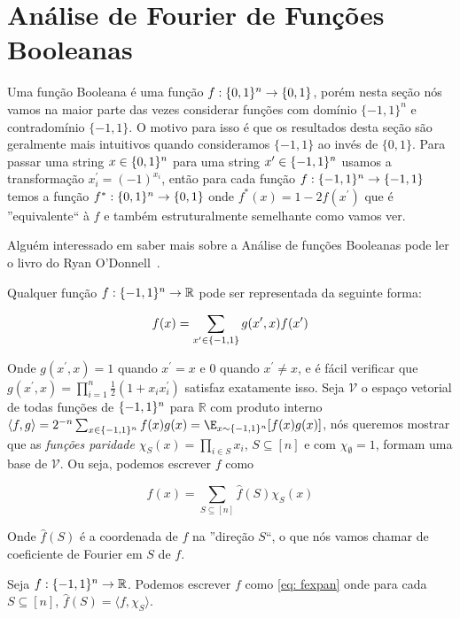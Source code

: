 \chapter{Análise de Fourier de Funções Booleanas} \label{funcoes_booleanas}

Uma função Booleana é uma função $f: \{0, 1\}^{n} \to \{0, 1\}$, porém nesta seção nós vamos na maior parte das vezes considerar funções com domínio $\{-1, 1\}^{n}$ e contradomínio $\{-1, 1\}$. O motivo para isso é que os resultados desta seção são geralmente mais intuitivos quando consideramos $\{-1, 1\}$ ao invés de $\{0, 1\}$. Para passar uma string $x \in \{0, 1\}^{n}$ para uma string $x^{\prime} \in \{-1, 1\}^{n}$ usamos a transformação $x^{\prime}_{i} = (-1)^{x_{i}}$, então para cada função $f: \{-1, 1\}^{n} \to \{-1, 1\}$ temos a função $f^{*}: \{0, 1\}^{n} \to \{0, 1\}$ onde $f^{*}(x) = 1 - 2f(x^{\prime})$ que é ''equivalente`` à $f$ e também estruturalmente semelhante como vamos ver.

Alguém interessado em saber mais sobre a Análise de funções Booleanas pode ler o livro do Ryan O'Donnell~\cite{o2014analysis}.

Qualquer função $f: \{-1, 1\}^{n} \to \mathbb{R}$ pode ser representada da seguinte forma:

\begin{equation} \label{eq: interpol}
f(x) = \sum_{x^{\prime} \in \{-1, 1\}} g(x^{\prime}, x)f(x^{\prime})
\end{equation}

Onde $g(x^{\prime}, x) = 1$ quando $x^{\prime} = x$ e 0 quando $x^{\prime} \neq x$, e é fácil verificar que $g(x^{\prime}, x) = \prod_{i = 1}^{n}\frac{1}{2}(1 + x_{i}x_{i}^{\prime})$ satisfaz exatamente isso. Seja $\mathcal{V}$ o espaço vetorial de todas funções de $\{-1, 1\}^{n}$ para $\mathbb{R}$ com produto interno $\langle f, g \rangle = 2^{-n}\sum_{x \in \pmonen}f(x)g(x) = \uniE[f(x)g(x)]$, nós queremos mostrar que as \emph{funções paridade} $\chi_{S}(x) = \prod_{i \in S}x_{i}$, $S \subseteq [n]$ e com $\chi_{\emptyset} = 1$, formam uma base de $\mathcal{V}$. Ou seja, podemos escrever $f$ como

\begin{equation} \label{eq: fexpan}
f(x) = \sum_{S \subseteq[n]}\widehat{f}(S)\chi_{S}(x)
\end{equation}

Onde $\widehat{f}(S)$ é a coordenada de $f$ na ''direção $S$``, o que nós vamos chamar de coeficiente de Fourier em $S$ de $f$.

\begin{prop}
Seja $f: \{-1, 1\}^{n} \to \mathbb{R}$. Podemos escrever $f$ como \ref{eq: fexpan} onde para cada $S \subseteq [n]$, $\widehat{f}(S) = \langle f, \chi_{S} \rangle$.
\end{prop}

